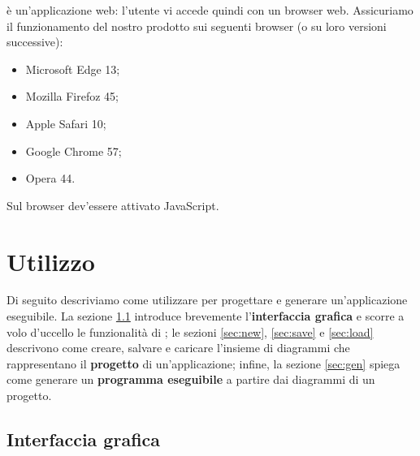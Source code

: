 \proj{} è un'applicazione web: l'utente vi accede quindi con un browser web. Assicuriamo il funzionamento del nostro prodotto sui seguenti browser (o su loro versioni successive):
\begin{itemize} %
	\item Microsoft Edge 13;
	\item Mozilla Firefoz 45;
	\item Apple Safari 10;
	\item Google Chrome 57;
	\item Opera 44.
\end{itemize}
Sul browser dev'essere attivato JavaScript.






\section{Utilizzo} \label{sec:utilizzo}

Di seguito descriviamo come utilizzare \proj{} per progettare e generare un'applicazione eseguibile. La sezione \ref{sec:gui} introduce brevemente l'\textbf{interfaccia grafica} e scorre a volo d'uccello le funzionalità di \proj; le sezioni \ref{sec:new}, \ref{sec:save} e \ref{sec:load} descrivono come creare, salvare e caricare l'insieme di diagrammi che rappresentano il \textbf{progetto} di un'applicazione; infine, la sezione \ref{sec:gen} spiega come generare un \textbf{programma eseguibile} a partire dai diagrammi di un progetto.



\subsection{Interfaccia grafica} \label{sec:gui}

